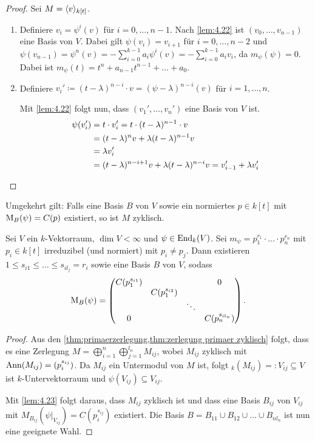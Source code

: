 \documentclass[12pt,a4paper]{scrartcl}
\theoremstyle{cplain}
\theoremstyle{cdef}
\begin{document}
\begin{proof}
	Sei $M = \langle v\rangle_{k[t]}$.
	\begin{enumerate}[label=\ref{lem:4.23:\roman*}]
		\item Definiere $v_i = \psi^i(v)$ für $i = 0,\dots, n-1$. Nach \cref{lem:4.22} ist $(v_0,\dots, v_{n-1})$ eine Basis von $V$. Dabei gilt $\psi(v_{i}) = v_{i+1}$ für $i = 0,\dots, n-2$ und $\psi(v_{n-1}) =\psi^n(v) = -\sum_{i = 0}^{k-1}a_i\psi^i(v) = -\sum_{i = 0}^{k-1}a_iv_i$, da $m_{\psi}(\psi) = 0$. Dabei ist $m_{\psi}(t) = t^n+a_{n-1}t^{n-1}+\dots + a_0$.
		\item Definiere $v_i'\coloneqq (t-\lambda)^{n-i}\cdot v = (\psi-\lambda)^{n-i}(v)$ für $i = 1,\dots, n$.
		
		Mit \cref{lem:4.22} folgt nun, dass $(v_1',\dots, v_n')$ eine Basis von $V$ ist.
		\begin{align*}
			\psi(v_i') &= t\cdot v_i' = t\cdot(t-\lambda)^{n-1}\cdot v\\
			&= (t-\lambda)^nv + \lambda (t-\lambda)^{n-1}v\\
			&= \lambda v_i'\\
			&= (t-\lambda)^{n-i+1}v +\lambda(t-\lambda)^{n-i}v = v_{i-1}' + \lambda v_i'
			\qedhere
		\end{align*}
	\end{enumerate}
\end{proof}

\begin{bem}
	Umgekehrt gilt: Falls eine Basis $B$ von $V$ sowie ein normiertes $p\in k[t]$ mit $\operatorname{M}_B(\psi) =C(p)$ existiert, so ist $M$ zyklisch.
\end{bem}

\begin{satz} Sei $V$ ein $k$-Vektorraum, $\dim V <\infty$ und $\psi\in\operatorname{End}_k(V)$. Sei $m_{\psi} = p_1^{r_1}\cdot\ldots\cdot p_n^{r_n}$ mit $p_i\in k[t]$ irreduzibel (und normiert) mit $p_i\neq p_j$. Dann existieren $1\leq s_{i1}\le\dots\le s_{i{l_j}}  = r_i$ sowie eine Basis $B$ von $V$, sodass
	\[ \operatorname{M}_B(\psi) = \begin{pmatrix}
	C(p_1^{s_{i1}}) &  &  & 0 \\ 
	& C(p_1^{s_{i2}}) &  &  \\ 
	&  & \ddots &  \\ 
	0 &  &  & C(p_n^{s_{i{l_n}}})
	\end{pmatrix}. \]
\end{satz}
\begin{proof}
	Aus den \cref{thm:primaerzerlegung,thm:zerlegung primaer zyklisch} folgt, dass es eine Zerlegung $M = \bigoplus_{i = 1}^n\bigoplus_{j = 1}^{l_n} M_{ij}$, wobei $M_{ij}$ zyklisch mit $\operatorname{Ann}(M_{ij})  = (p_i^{s_{ij}})$. Da $M_{ij}$ ein Untermodul von $M$ ist, folgt ${}_k(M_{ij}) =: V_{ij}\subseteq V$ ist $k$-Untervektorraum und $\psi(V_{ij})\subseteq V_{ij}$.
	
	Mit \cref{lem:4.23} folgt daraus, dass $M_{ij}$ zyklisch ist und dass eine Basis $B_{ij}$ von $V_{ij}$ mit $M_{B_{ij}}(\psi|_{V_{ij}}) = C(p_i^{s_{ij}})$ existiert. Die Basis $B = B_{11}\cup B_{12}\cup \dots \cup B_{nl_n}$ ist nun eine geeignete Wahl.
\end{proof}
\end{document}
